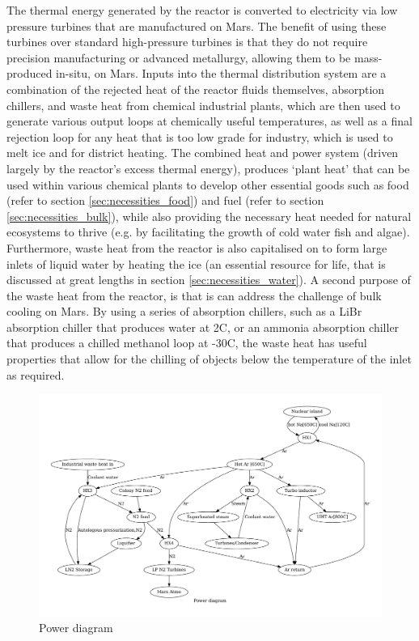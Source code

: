 \documentclass[fleqn,10pt]{Stylesheet} %
\begin{document}
The thermal energy generated by the reactor is converted to electricity via low pressure turbines that are manufactured on Mars. The benefit of using these turbines over standard high-pressure turbines is that they do not require precision manufacturing or advanced metallurgy, allowing them to be mass-produced in-situ, on Mars. Inputs into the thermal distribution system are a combination of the rejected heat of the reactor fluids themselves, absorption chillers, and waste heat from chemical industrial plants, which are then used to generate various output loops at chemically useful temperatures, as well as a final rejection loop for any heat that is too low grade for industry, which is used to melt ice and for district heating. The combined heat and power system (driven largely by the reactor’s excess thermal energy), produces ‘plant heat’ that can be used within various chemical plants to develop other essential goods such as food (refer to section \ref{sec:necessities_food}) and fuel (refer to section \ref{sec:necessities_bulk}), while also providing the necessary heat needed for natural ecosystems to thrive (e.g. by facilitating the growth of cold water fish and algae). Furthermore, waste heat from the reactor is also capitalised on to form large inlets of liquid water by heating the ice (an essential resource for life, that is discussed at great lengths in section \ref{sec:necessities_water}). A second purpose of the waste heat from the reactor, is that is can address the challenge of bulk cooling on Mars. By using a series of absorption chillers, such as a LiBr absorption chiller that produces water at 2\degree{}C, or an ammonia absorption chiller that produces a chilled methanol loop at -30\degree{}C, the waste heat has useful properties that allow for the chilling of objects below the temperature of the inlet as required.

\begin{figure}
    \centering
    \includegraphics[width=\linewidth]{figures/fig_power.pdf}
    \caption{Power diagram}
    \label{fig:power_diagram}
\end{figure}
\end{document}
